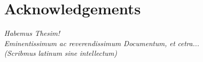 \newpage
\section*{Acknowledgements}
\begin{singlespace}
	\emph{Habemus Thesim!\\
		Eminentissimum ac reverendissimum Documentum, et cetra...\\
		(Scribmus latinum sine intellectum)}
\end{singlespace}
